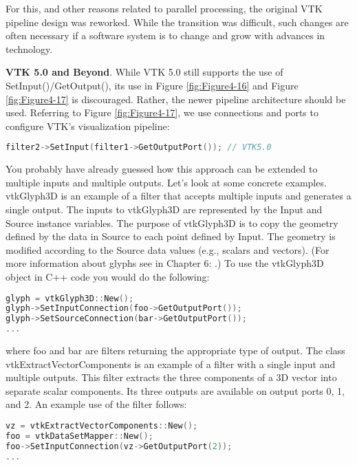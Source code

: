 For this, and other reasons related to parallel processing, the original VTK pipeline design was reworked. While the transition was difficult, such changes are often necessary if a software system is to change and grow with advances in technology.

\textbf{VTK 5.0 and Beyond}. While VTK 5.0 still supports the use of SetInput()/GetOutput(), its use in Figure \ref{fig:Figure4-16} and Figure \ref{fig:Figure4-17} is discouraged. Rather, the newer pipeline architecture should be used. Referring to Figure \ref{fig:Figure4-17}, we use connections and ports to configure VTK's visualization pipeline:


\begin{lstlisting}[language=C++, caption={}, numbers=none, frame=none]
filter2->SetInput(filter1->GetOutputPort()); // VTK5.0
\end{lstlisting}

You probably have already guessed how this approach can be extended to multiple inputs and multiple outputs. Let's look at some concrete examples. vtkGlyph3D is an example of a filter that accepts multiple inputs and generates a single output. The inputs to vtkGlyph3D are represented by the Input and Source instance variables. The purpose of vtkGlyph3D is to copy the geometry defined by the data in Source to each point defined by Input. The geometry is modified according to the Source data values (e.g., scalars and vectors). (For more information about glyphs see  in Chapter 6: .) To use the vtkGlyph3D object in C++ code you would do the following:

\begin{lstlisting}[language=C++, caption={}, numbers=none, frame=none]
glyph = vtkGlyph3D::New();
glyph->SetInputConnection(foo->GetOutputPort());
glyph->SetSourceConnection(bar->GetOutputPort());
...
\end{lstlisting}

where foo and bar are filters returning the appropriate type of output. The class vtkExtractVectorComponents is an example of a filter with a single input and multiple outputs. This filter extracts the three components of a 3D vector into separate scalar components. Its three outputs are available on output ports 0, 1, and 2. An example use of the filter follows:

\begin{lstlisting}[language=C++, caption={}, numbers=none, frame=none]
vz = vtkExtractVectorComponents::New();
foo = vtkDataSetMapper::New();
foo->SetInputConnection(vz->GetOutputPort(2));
...
\end{lstlisting}

